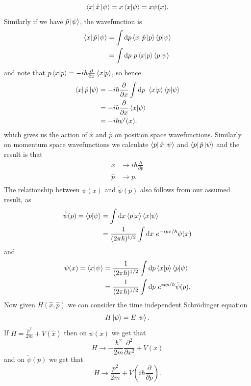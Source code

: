 \documentclass{article}
\begin{document}
\[
	\bra x \hat x \ket \psi = x\bra {x}\ket {\psi} = x \psi(x).
\]
Similarly if we have $ \hat p \ket \psi $, the wavefunction is
\begin{align*}
	\bra x \hat p \ket \psi &= \int\mathrm dp \bra x \hat p \ket p \bra{p}\ket{\psi} \\
				&=\int \mathrm dp\ p \bra {x}\ket{p} \bra{p}\ket{\psi}
\end{align*}
and note that $ p\bra{x}\ket{p} = -i\hbar \frac\partial{\partial x} \bra {x}\ket{p} $, so hence
\begin{align*}
	\bra x \hat p \ket \psi& = -i\hbar \frac{\partial}{\partial x} \int \mathrm dp \ \bra {x}\ket{p} \bra{p} \ket{\psi}\\
			       &= -i\hbar \frac{\partial}{\partial x}\bra{x}\ket{\psi} \\
			       &= -i\hbar \psi'(x).
\end{align*}
which gives us the action of $ \hat x $ and $ \hat p $ on position space wavefunctions. Similarly on momentum space wavefunctions we calculate $ \bra p \hat x \ket \psi $ and $ \bra p \hat p \ket \psi $ and the result is that
\begin{align*}
	\hat x &\longrightarrow i\hbar \frac\partial{\partial p} \\
	\hat p &\longrightarrow p. \\
\end{align*}
The relationship between $ \psi(x) $ and $ \tilde\psi(p) $ also follows from our assumed result, as
\begin{align*}
	\tilde \psi(p) = \bra{p}\ket{\psi} &= \int \mathrm dx \bra{p}\ket{x} \bra{x}\ket{\psi} \\
					   &= \frac 1{(2\pi \hbar)^{1/2}} \int\mathrm dx \ e^{-ipx/\hbar} \psi(x)
\end{align*}
and
\begin{align*}
	\psi(x) = \bra{x}\ket{\psi} &= \frac 1{(2\pi \hbar)^{1/2}} \int \mathrm dp \bra{x}\ket{p} \bra{p}\ket{\psi} \\
				    &= \frac 1{(2\pi \hbar)^{1/2}} \int\mathrm dp \ e^{ixp/\hbar} \tilde \psi(p). \\
\end{align*}
Now given $ H(\hat x, \hat p) $ we can consider the time independent Schr\"odinger equation
\[
  H\ket \psi = E \ket \psi.
\]
If $ H = \frac{\hat p^2}{2m} + V(\hat x) $ then on $ \psi(x) $ we get that
\[
	H\to -\frac{\hbar^2}{2m}\frac{\partial^2}{\partial x^2} + V(x)
\]
and on $ \tilde \psi(p) $ we get that
\[
	H\to \frac{p^2}{2m} + V\left(i\hbar\frac{\partial}{\partial p}\right).
\]
\end{document}
